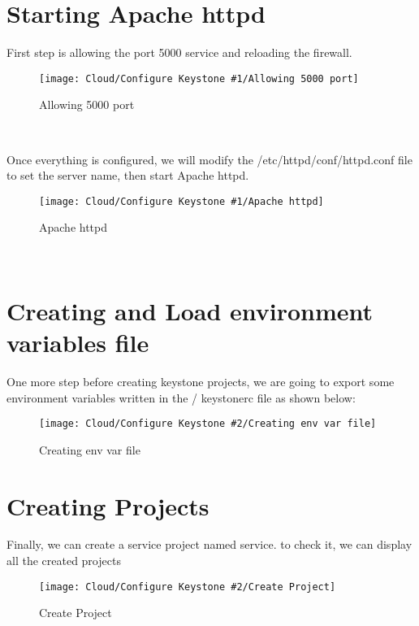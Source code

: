 \begin{spacing}{1.2}
\section{Starting Apache httpd}
\par 
First step is allowing the port 5000 service and reloading the firewall.
\\
\begin{figure}[!htb] 
\begin{center} 
\texttt{[image: Cloud/Configure Keystone \#1/Allowing 5000 port]} 
\end{center} 
\caption{Allowing 5000 port} 
\end{figure}  \FloatBarrier
\\
\par 
Once everything is configured, we will modify the /etc/httpd/conf/httpd.conf file to set the server name, then start Apache httpd. 
\\
\begin{figure}[!htb] 
\begin{center} 
\texttt{[image: Cloud/Configure Keystone \#1/Apache httpd]} 
\end{center} 
\caption{Apache httpd} 
\end{figure}  \FloatBarrier
\\
\section{Creating and Load environment variables file}

\par One more step before creating keystone projects, we are going to export some environment variables written in the  / keystonerc file as shown below: 
\begin{figure}[!htb] 
\begin{center} 
\texttt{[image: Cloud/Configure Keystone \#2/Creating env var file]} 
\end{center} 
\caption{Creating env var file} 
\end{figure}  \FloatBarrier

\section{Creating Projects}

\par Finally, we can create a service project named service. to check it, we can display all the created projects 

\begin{figure}[!htb] 
\begin{center} 
\texttt{[image: Cloud/Configure Keystone \#2/Create Project]} 
\end{center} 
\caption{Create Project} 
\end{figure}  \FloatBarrier
\\

\end{spacing}